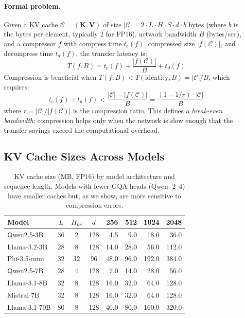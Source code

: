 \documentclass{article}
\begin{document}
\paragraph{Formal problem.} Given a KV cache $\mathcal{C} = (\mathbf{K}, \mathbf{V})$ of size $|\mathcal{C}| = 2 \cdot L \cdot H \cdot S \cdot d \cdot b$ bytes (where $b$ is the bytes per element, typically 2 for FP16), network bandwidth $B$ (bytes/sec), and a compressor $f$ with compress time $t_c(f)$, compressed size $|f(\mathcal{C})|$, and decompress time $t_d(f)$, the transfer latency is:
\begin{equation}
T(f, B) = t_c(f) + \frac{|f(\mathcal{C})|}{B} + t_d(f)
\label{eq:transfer_latency}
\end{equation}
Compression is beneficial when $T(f, B) < T(\text{identity}, B) = |\mathcal{C}| / B$, which requires:
\begin{equation}
t_c(f) + t_d(f) < \frac{|\mathcal{C}| - |f(\mathcal{C})|}{B} = \frac{(1 - 1/r) \cdot |\mathcal{C}|}{B}
\label{eq:breakeven}
\end{equation}
where $r = |\mathcal{C}| / |f(\mathcal{C})|$ is the compression ratio. This defines a \emph{break-even bandwidth}: compression helps only when the network is slow enough that the transfer savings exceed the computational overhead.

\subsection{KV Cache Sizes Across Models}

\begin{table}[t]
\centering
\caption{KV cache size (MB, FP16) by model architecture and sequence length. Models with fewer GQA heads (Qwen: 2--4) have smaller caches but, as we show, are more sensitive to compression errors.}
\label{tab:kv_sizes}
\small
\begin{tabular}{lcccrrrr}
\toprule
\textbf{Model} & $L$ & $H_{kv}$ & $d$ & \textbf{256} & \textbf{512} & \textbf{1024} & \textbf{2048} \\
\midrule
Qwen2.5-3B & 36 & 2 & 128 & 4.5 & 9.0 & 18.0 & 36.0 \\
Llama-3.2-3B & 28 & 8 & 128 & 14.0 & 28.0 & 56.0 & 112.0 \\
Phi-3.5-mini & 32 & 32 & 96 & 48.0 & 96.0 & 192.0 & 384.0 \\
Qwen2.5-7B & 28 & 4 & 128 & 7.0 & 14.0 & 28.0 & 56.0 \\
Llama-3.1-8B & 32 & 8 & 128 & 16.0 & 32.0 & 64.0 & 128.0 \\
Mistral-7B & 32 & 8 & 128 & 16.0 & 32.0 & 64.0 & 128.0 \\
\midrule
Llama-3.1-70B & 80 & 8 & 128 & 40.0 & 80.0 & 160.0 & 320.0 \\
\bottomrule
\end{tabular}
\end{table}
\end{document}
